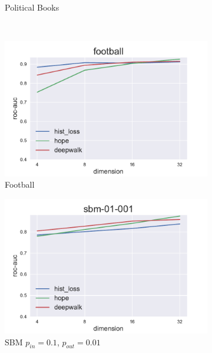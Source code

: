 \documentclass[12pt,a4paper]{extarticle}
\begin{document}
\begin{figure}
\begin{subfigure}{.5\linewidth}
    \caption{Political Books}
    \label{fig:lp_pol}
    \end{subfigure}
    \\[1ex]
    \begin{subfigure}{.5\linewidth}
    \centering
    \includegraphics[width=\linewidth]{src/images/Link_prediction_football.pdf}
    \caption{Football}
    \label{fig:lp_foot}
    \end{subfigure}
    \begin{subfigure}{.5\linewidth}
    \centering
    \includegraphics[width=\linewidth]{src/images/Link_prediction_sbm-01-001.pdf}
    \caption{SBM $p_{in}=0.1$, $p_{out}=0.01$}
    \label{fig:lp_sbm1}
    \end{subfigure}
    \\[1ex]
    \begin{subfigure}{.5\linewidth}
    \centering

\end{subfigure}
\end{figure}
\end{document}
